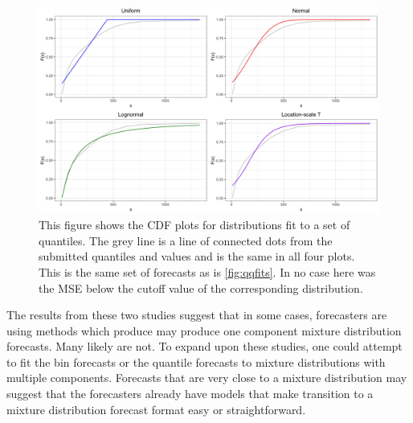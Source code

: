 \documentclass[11pt,notitlepage]{isuthesis}
\begin{document}
\begin{figure}[htbp]
\centerline{\includegraphics[scale=.15]{Images/cdf_gleam_110121_1wkincdeath_st16.png}}
\begin{center}
\begin{minipage}{10cm}
\captionsetup{font=scriptsize}
\caption[CDF plot for quantile fit]{This figure shows the CDF plots for 
distributions fit to a set of quantiles. The grey line is a line of connected 
dots from the submitted quantiles and values and is the same in all four plots.
This is the same set of forecasts as is \ref{fig:qqfits}.
In no case here was the MSE below the cutoff value of the 
corresponding distribution.}
\label{fig:cdffits}
\end{minipage}
\end{center}
\end{figure}



The results from these two studies suggest that in some cases, forecasters
are using methods which produce may produce one component mixture distribution
forecasts. Many
likely are not. To expand upon these studies, one could attempt to fit the 
bin forecasts or the quantile forecasts to mixture 
distributions with multiple components. Forecasts that are very close to 
a mixture distribution may suggest that the forecasters already have models that
make transition to a mixture distribution forecast format easy or
straightforward.
\end{document}
